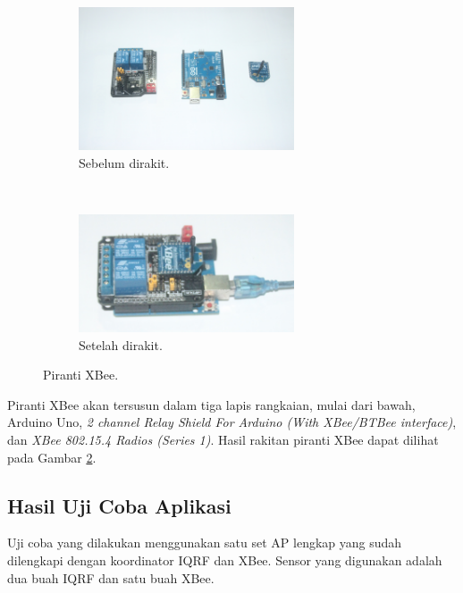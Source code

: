 			\begin{figure}[H]
				\begin{subfigure}[b]{\textwidth}
					\centering
				    \includegraphics[width=0.7\textwidth]{gambar/xbee-stripped}
				    \caption{Sebelum dirakit.}
				    \label{xbee-stripped}
				\end{subfigure}
				 ~
				\begin{subfigure}[b]{\textwidth}
					\centering
				    \includegraphics[width=0.7\textwidth]{gambar/xbee-complete}
				    \caption{Setelah dirakit.}
				    \label{xbee-complete}
				\end{subfigure}
				\caption{Piranti XBee.}
				\label{xbee-relay}
			\end{figure}

			Piranti XBee akan tersusun dalam tiga lapis rangkaian, mulai dari bawah, Arduino Uno, \emph{2 channel Relay Shield For Arduino (With XBee/BTBee interface)}, dan \emph{XBee 802.15.4 Radios (Series 1)}. Hasil rakitan piranti XBee dapat dilihat pada Gambar \ref{xbee-complete}.

		\subsection{Hasil Uji Coba Aplikasi}
			Uji coba yang dilakukan menggunakan satu set AP lengkap yang sudah dilengkapi dengan koordinator IQRF dan XBee. Sensor yang digunakan adalah dua buah IQRF dan satu buah XBee.

